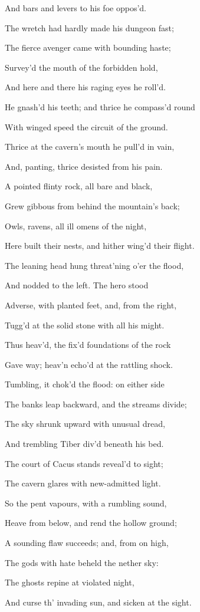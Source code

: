 And bars and levers to his foe oppos’d.

The wretch had hardly made his dungeon fast;

The fierce avenger came with bounding haste;

Survey’d the mouth of the forbidden hold,

And here and there his raging eyes he roll’d.

He gnash’d his teeth; and thrice he compass’d round

With winged speed the circuit of the ground.

Thrice at the cavern’s mouth he pull’d in vain,

And, panting, thrice desisted from his pain.

A pointed flinty rock, all bare and black,

Grew gibbous from behind the mountain’s back;

Owls, ravens, all ill omens of the night,

Here built their nests, and hither wing’d their flight.

The leaning head hung threat’ning o’er the flood,

And nodded to the left. The hero stood

Adverse, with planted feet, and, from the right,

Tugg’d at the solid stone with all his might.

Thus heav’d, the fix’d foundations of the rock

Gave way; heav’n echo’d at the rattling shock.

Tumbling, it chok’d the flood: on either side

The banks leap backward, and the streams divide;

The sky shrunk upward with unusual dread,

And trembling Tiber div’d beneath his bed.

The court of Cacus stands reveal’d to sight;

The cavern glares with new-admitted light.

So the pent vapours, with a rumbling sound,

Heave from below, and rend the hollow ground;

A sounding flaw succeeds; and, from on high,

The gods with hate beheld the nether sky:

The ghosts repine at violated night,

And curse th’ invading sun, and sicken at the sight.

